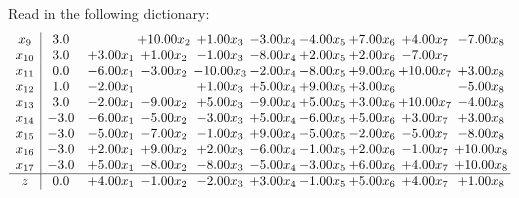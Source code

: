 \documentclass[9pt]{article}
\begin{document}
Read in the following dictionary:
\[\begin{array}{c| c c@{\hskip 2pt} c@{\hskip 2pt} c@{\hskip 2pt} c@{\hskip 2pt} c@{\hskip 2pt} c@{\hskip 2pt} c@{\hskip 2pt} c@{\hskip 2pt} }
 x_{9}   &  3.0  &   & + 10.00 x_{2} & +  1.00 x_{3} & -3.00 x_{4} & -4.00 x_{5} & +  7.00 x_{6} & +  4.00 x_{7} & -7.00 x_{8}\\
 x_{10}   &  3.0 & +  3.00 x_{1} & +  1.00 x_{2} & -1.00 x_{3} & -8.00 x_{4} & +  2.00 x_{5} & +  2.00 x_{6} & -7.00 x_{7} &   \\
 x_{11}   &  0.0 & -6.00 x_{1} & -3.00 x_{2} & -10.00 x_{3} & -2.00 x_{4} & -8.00 x_{5} & +  9.00 x_{6} & + 10.00 x_{7} & +  3.00 x_{8}\\
 x_{12}   &  1.0 & -2.00 x_{1} &   & +  1.00 x_{3} & +  5.00 x_{4} & +  9.00 x_{5} & +  3.00 x_{6} &   & -5.00 x_{8}\\
 x_{13}   &  3.0 & -2.00 x_{1} & -9.00 x_{2} & +  5.00 x_{3} & -9.00 x_{4} & +  5.00 x_{5} & +  3.00 x_{6} & + 10.00 x_{7} & -4.00 x_{8}\\
 x_{14}   &  -3.0 & -6.00 x_{1} & -5.00 x_{2} & -3.00 x_{3} & +  5.00 x_{4} & -6.00 x_{5} & +  5.00 x_{6} & +  3.00 x_{7} & +  3.00 x_{8}\\
 x_{15}   &  -3.0 & -5.00 x_{1} & -7.00 x_{2} & -1.00 x_{3} & +  9.00 x_{4} & -5.00 x_{5} & -2.00 x_{6} & -5.00 x_{7} & -8.00 x_{8}\\
 x_{16}   &  -3.0 & +  2.00 x_{1} & +  9.00 x_{2} & +  2.00 x_{3} & -6.00 x_{4} & -1.00 x_{5} & +  2.00 x_{6} & -1.00 x_{7} & + 10.00 x_{8}\\
 x_{17}   &  -3.0 & +  5.00 x_{1} & -8.00 x_{2} & -8.00 x_{3} & -5.00 x_{4} & -3.00 x_{5} & +  6.00 x_{6} & +  4.00 x_{7} & + 10.00 x_{8}\\
\hline
z    &  0.0 & +  4.00 x_{1} & -1.00 x_{2} & -2.00 x_{3} & +  3.00 x_{4} & -1.00 x_{5} & +  5.00 x_{6} & +  4.00 x_{7} & +  1.00 x_{8}\\
\end{array}\]
\end{document}
